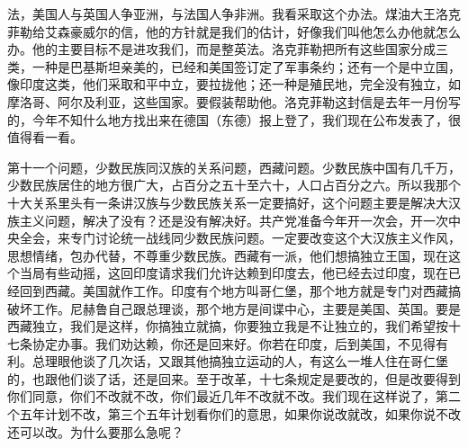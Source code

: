 法，美国人与英国人争亚洲，与法国人争非洲。我看采取这个办法。煤油大王洛克菲勒给艾森豪威尔的信，他的方针就是我们的估计，好像我们叫他怎么办他就怎么办。他的主要目标不是进攻我们，而是整英法。洛克菲勒把所有这些国家分成三类，一种是巴基斯坦亲美的，已经和美国签订定了军事条约；还有一个是中立国，像印度这类，他们采取和平中立，要拉拢他；还一种是殖民地，完全没有独立，如摩洛哥、阿尔及利亚，这些国家。要假装帮助他。洛克菲勒这封信是去年一月份写的，今年不知什么地方找出来在德国（东德）报上登了，我们现在公布发表了，很值得看一看。

第十一个问题，少数民族同汉族的关系问题，西藏问题。少数民族中国有几千万，少数民族居住的地方很广大，占百分之五十至六十，人口占百分之六。所以我那个十大关系里头有一条讲汉族与少数民族关系一定要搞好，这个问题主要是解决大汉族主义问题，解决了没有？还是没有解决好。共产党准备今年开一次会，开一次中央全会，来专门讨论统一战线同少数民族问题。一定要改变这个大汉族主义作风，思想情绪，包办代替，不尊重少数民族。西藏有一派，他们想搞独立王国，现在这个当局有些动摇，这回印度请求我们允许达赖到印度去，他已经去过印度，现在已经回到西藏。美国就作工作。印度有个地方叫哥仁堡，那个地方就是专门对西藏搞破坏工作。尼赫鲁自己跟总理谈，那个地方是间谍中心，主要是美国、英国。要是西藏独立，我们是这样，你搞独立就搞，你要独立我是不让独立的，我们希望按十七条协定办事。我们劝达赖，你还是回来好。你若在印度，后到美国，不见得有利。总理眼他谈了几次话，又跟其他搞独立运动的人，有这么一堆人住在哥仁堡的，也跟他们谈了话，还是回来。至于改革，十七条规定是要改的，但是改要得到你们同意，你们不改就不改，你们最近几年不改就不改。我们现在这样说了，第二个五年计划不改，第三个五年计划看你们的意思，如果你说改就改，如果你说不改还可以改。为什么要那么急呢？

